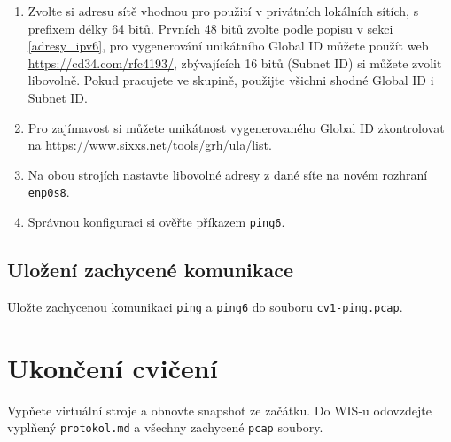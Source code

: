 \begin{enumerate}
    \item Zvolte si adresu sítě vhodnou pro použití v privátních lokálních
        sítích, s prefixem délky 64 bitů. Prvních 48 bitů zvolte podle popisu v
        sekci \ref{adresy_ipv6}, pro vygenerování unikátního Global ID můžete
        použít web \url{https://cd34.com/rfc4193/}, zbývajících 16 bitů (Subnet
        ID) si můžete zvolit libovolně. Pokud pracujete ve skupině, použijte
        všichni shodné Global ID i Subnet ID.
    \item Pro zajímavost si můžete unikátnost vygenerovaného Global ID
        zkontrolovat na \url{https://www.sixxs.net/tools/grh/ula/list}.
    \item Na obou strojích nastavte libovolné adresy z dané síťe na novém rozhraní \texttt{enp0s8}.
    \item Správnou konfiguraci si ověřte příkazem {\tt ping6}.
\end{enumerate}

\subsection*{Uložení zachycené komunikace}
Uložte zachycenou komunikaci \texttt{ping} a \texttt{ping6} do souboru \texttt{cv1-ping.pcap}.

\section{Ukončení cvičení}
Vypňete virtuální stroje a obnovte snapshot ze začátku.
Do WIS-u odovzdejte vyplňený \texttt{protokol.md} a všechny zachycené \texttt{pcap} soubory.
